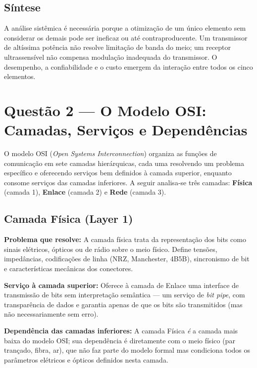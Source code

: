 \documentclass[conference]{IEEEtran}
\begin{document}
\subsection*{Síntese}

A análise sistêmica é necessária porque a otimização de um único elemento sem considerar os
demais pode ser ineficaz ou até contraproducente. Um transmissor de altíssima potência não
resolve limitação de banda do meio; um receptor ultrassensível não compensa modulação inadequada
do transmissor. O desempenho, a confiabilidade e o custo emergem da interação entre todos os
cinco elementos.

\section*{Questão 2 — O Modelo OSI: Camadas, Serviços e Dependências}

O modelo OSI (\textit{Open Systems Interconnection}) organiza as funções de comunicação em
sete camadas hierárquicas, cada uma resolvendo um problema específico e oferecendo serviços
bem definidos à camada superior, enquanto consome serviços das camadas inferiores. A seguir
analisa-se três camadas: \textbf{Física} (camada 1), \textbf{Enlace} (camada 2) e
\textbf{Rede} (camada 3).

\subsection*{Camada Física (Layer 1)}

\textbf{Problema que resolve:} A camada física trata da representação dos bits como sinais
elétricos, ópticos ou de rádio sobre o meio físico. Define tensões, impedâncias, codificações
de linha (NRZ, Manchester, 4B5B), sincronismo de bit e características mecânicas dos conectores.

\textbf{Serviço à camada superior:} Oferece à camada de Enlace uma interface de transmissão
de bits sem interpretação semântica --- um serviço de \textit{bit pipe}, com transparência
de dados e garantia apenas de que os bits são transmitidos (mas não necessariamente sem erro).

\textbf{Dependência das camadas inferiores:} A camada Física \textit{é} a camada mais baixa do
modelo OSI; sua dependência é diretamente com o meio físico (par trançado, fibra, ar), que não
faz parte do modelo formal mas condiciona todos os parâmetros elétricos e ópticos definidos
nesta camada.
\end{document}
